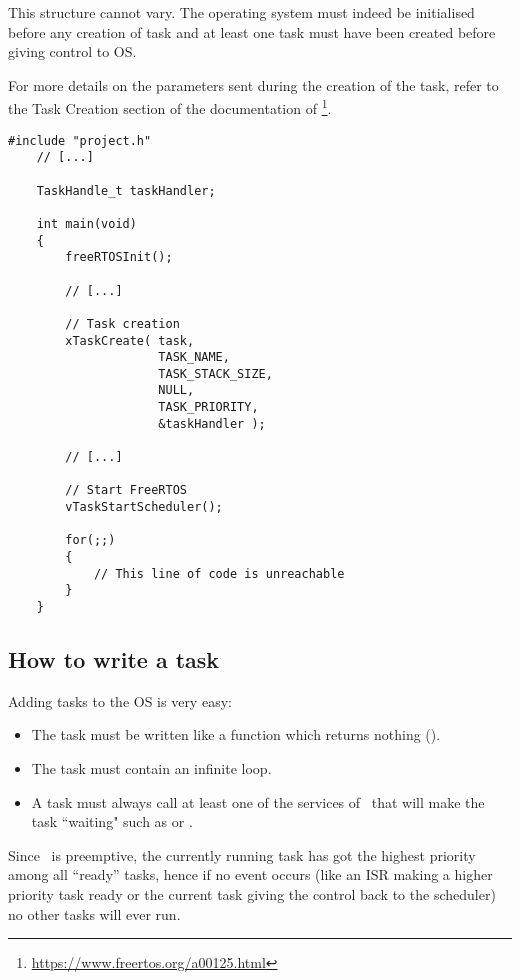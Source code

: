     This structure cannot vary. The operating system must indeed be initialised before any creation of task and at least one task must have been created before giving control to OS.
    
    For more details on the parameters sent during the creation of the task, refer to the Task Creation section of the documentation of \rtos\footnote{\url{https://www.freertos.org/a00125.html}}.
    \begin{lstlisting}[caption={Function main.c}, label={lst:listing 1}]
    #include "project.h"
    // [...]
    
    TaskHandle_t taskHandler;
    
    int main(void)
    {
        freeRTOSInit();
        
        // [...]
        
        // Task creation
        xTaskCreate( task,
                     TASK_NAME,
                     TASK_STACK_SIZE,
                     NULL,
                     TASK_PRIORITY,
                     &taskHandler );
    
        // [...]
        
        // Start FreeRTOS
        vTaskStartScheduler();     
        
        for(;;)
        {
            // This line of code is unreachable
        }
    }
    \end{lstlisting}

\subsection{How to write a task}
    Adding tasks to the OS is very easy:
    \begin{itemize}
        \item The task must be written like a function which returns nothing ().
        \item The task must contain an infinite loop.
        \item A task must always call at least one of the services of \rtos~that will make the task \mbox{``waiting"} such as   or .
    \end{itemize}
    Since \rtos~is preemptive, the currently running task has got the highest priority among all “ready” tasks, hence if no event occurs (like an ISR making a higher priority task ready or the current task giving the control back to the scheduler) no other tasks will ever run.

